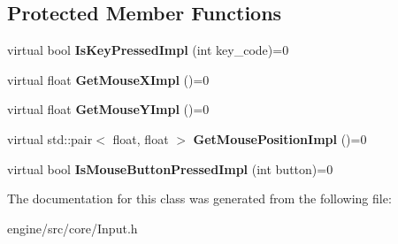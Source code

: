 \subsection*{Protected Member Functions}
\begin{DoxyCompactItemize}
\item 
\mbox{\label{classengine_1_1Input_a296cc17bac6e2ebc45d178c3c06c0d63}} 
virtual bool {\bfseries Is\+Key\+Pressed\+Impl} (int key\+\_\+code)=0
\item 
\mbox{\label{classengine_1_1Input_ad9b92c2cccac4db3431bed2143326329}} 
virtual float {\bfseries Get\+Mouse\+X\+Impl} ()=0
\item 
\mbox{\label{classengine_1_1Input_a490d05f204808bdae219da6d1b03eb12}} 
virtual float {\bfseries Get\+Mouse\+Y\+Impl} ()=0
\item 
\mbox{\label{classengine_1_1Input_a0d98b07560fa833c7a482341e6c76dbc}} 
virtual std\+::pair$<$ float, float $>$ {\bfseries Get\+Mouse\+Position\+Impl} ()=0
\item 
\mbox{\label{classengine_1_1Input_a9fb17f21b15540890cb69d87d3749cdd}} 
virtual bool {\bfseries Is\+Mouse\+Button\+Pressed\+Impl} (int button)=0
\end{DoxyCompactItemize}


The documentation for this class was generated from the following file\+:\begin{DoxyCompactItemize}
\item 
engine/src/core/Input.\+h\end{DoxyCompactItemize}
